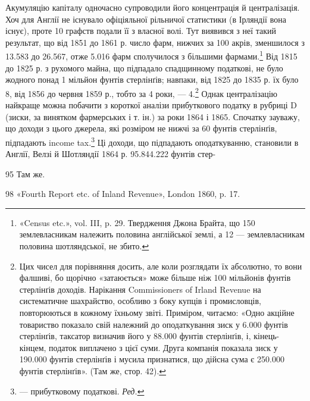 Акумуляцію капіталу одночасно супроводили його концентрація
й централізація. Хоч для Англії не існувало офіціяльної
рільничої статистики (в Ірляндії вона існує), проте 10 графств подали
її з власної волі. Тут виявився з неї такий результат, що від
1851 до 1861 р. число фарм, нижчих за 100 акрів, зменшилося з
13.583 до 26.567, отже 5.016 фарм сполучилося з більшими фармами.\footnote{
«Census etc.», vol. III, p. 29. Твердження Джона Брайта, що 150
землевласникам належить половина англійської землі, а 12 — землевласникам
половина шотляндської, не збито.
}  Від 1815 до 1825 р. з рухомого майна, що підпадало спадщинному
податкові, не було жодного понад 1 мільйон фунтів стерлінґів;
навпаки, від 1825 до 1835 р. їх було 8, від 1856 до червня
1859 р., тобто за 4 роки, — 4.\footnote{
Цих чисел для порівняння досить, але коли розглядати їх абсолютно,
то вони фалшиві, бо щорічно «затаюється» може більше ніж
100 мільйонів фунтів стерлінґів доходів. Нарікання Commissioners of Irland
Revenue на систематичне шахрайство, особливо з боку купців і промисловців,
повторюються в кожному їхньому звіті. Приміром, читаємо:
«Одно акційне товариство показало свій належний до оподаткування зиск
у 6.000 фунтів стерлінґів, таксатор визначив його у 88.000 фунтів стерлінґів,
і, кінець-кінцем, податок виплачено з цієї суми. Друга компанія
показала зиск у 190.000 фунтів стерлінґів і мусила признатися, що
дійсна сума є 250.000 фунтів стерлінґів». (Там же, стор. 42).
} Однак централізацію найкраще
можна побачити з короткої аналізи прибуткового податку
в рубриці D (зиски, за винятком фармерських і т. ін.) за роки
1864 і 1865. Спочатку зауважу, що доходи з цього джерела,
які розміром не нижчі за 60 фунтів стерлінґів, підпадають
income tax.\footnote*{
— прибутковому податкові. \emph{Ред.}
} Ці доходи, що підпадають оподаткуванню, становили
в Англії, Велзі й Шотляндії 1864 р. 95.844.222 фунтів стер-

95    Там же.

98 «Fourth Report etc. of Inland Revenue», London 1860, p. 17.